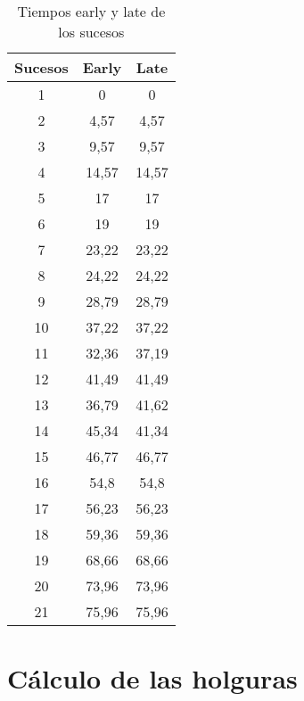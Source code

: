 \documentclass[11pt,a4paper,spanish,twoside]{report}
\begin{document}
\begin{table}[!h]
\centering
  \begin{tabular}{|c c c|}
    \hline
    \textbf{Sucesos} & \textbf{Early} & \textbf{Late} \\
    \hline \hline
    1 & 0 & 0 \\
    \hline
    2 & 4,57 & 4,57\\
    \hline
    3 & 9,57 & 9,57\\
    \hline
    4 & 14,57 & 14,57\\
    \hline
    5 & 17 & 17\\
    \hline
    6 & 19 & 19\\
    \hline
    7 & 23,22 & 23,22\\
    \hline
    8 & 24,22 & 24,22\\
    \hline
    9 & 28,79 & 28,79\\
    \hline
    10 & 37,22 & 37,22\\
    \hline
    11 & 32,36 & 37,19\\
    \hline
    12 & 41,49 & 41,49\\
    \hline
    13 & 36,79 & 41,62\\
    \hline
    14 & 45,34 & 41,34\\
    \hline
    15 & 46,77 & 46,77\\
    \hline
    16 & 54,8 & 54,8\\
    \hline
    17 & 56,23 & 56,23\\
    \hline
    18 & 59,36 & 59,36\\
    \hline
    19 & 68,66 & 68,66\\
    \hline
    20 & 73,96 & 73,96\\
    \hline
    21 & 75,96 & 75,96\\
    \hline
  \end{tabular}
  \caption{Tiempos early y late de los sucesos}
  \label{Tab:tearly}
\end{table}

\section{Cálculo de las holguras}
\end{document}
